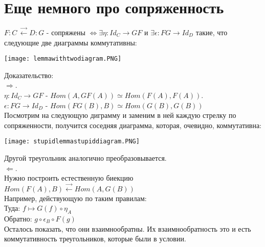 \documentclass[a4paper]{article}
\theoremstyle{indented}
\theoremstyle{definition}
\theoremstyle{remark}
\DeclareMathOperator{\la}{\leftarrow}
\DeclareMathOperator{\ra}{\rightarrow}
\DeclareMathOperator{\La}{\Leftarrow}
\DeclareMathOperator{\Ra}{\Rightarrow}
\DeclareMathOperator{\Lra}{\Leftrightarrow}
\begin{document}
\section{Еще немного про сопряженность}
\lemma $F: C\,\overset{\longrightarrow}{\la} D: G$ - сопряжены $\Lra \exists \eta: Id_C \ra GF$ и $\exists \epsilon: FG \ra Id_D$ такие, что следующие две диаграммы коммутативны:
\begin{center}\texttt{[image: lemmawithtwodiagram.PNG]}\end{center}
Доказательство:\\
$\Ra$. \\
$\eta: Id_C \ra GF$ - $Hom(A, GF(A)) \simeq Hom(F(A), F(A))$. \\
$\epsilon: FG \ra Id_D$ - $Hom(FG(B), B) \simeq Hom(G(B), G(B))$ \\
Посмотрим на следующую диграмму и заменим в ней каждую стрелку по сопряженности, получится соседняя диаграмма, которая, очевидно, коммутативна:
\begin{center}\texttt{[image: stupidlemmastupiddiagram.PNG]}\end{center}
Другой треугольник аналогично преобразовывается.\\
$\La$. \\
Нужно построить естественную биекцию $Hom(F(A), B) \overset{\longrightarrow}{\la} Hom(A, G(B))$ \\
Например, действующую по таким правилам: \\
Туда: $f \mapsto G(f) \circ \eta_A$ \\
Обратно: $g \circ \epsilon_B \circ F(g)$ \\
Осталось показать, что они взаимнообратны.
Их взаимнообратность это и есть коммутативность треугольников, которые были в условии.
\end{document}
